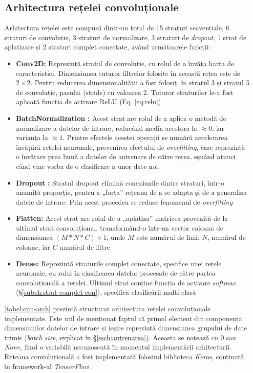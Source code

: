 \subsection{Arhitectura rețelei convoluționale}
Arhitectura rețelei este compusă dintr-un total de 15 straturi secvențiale, 6 straturi de convoluție, 3 straturi de normalizare, 3 straturi de \textit{dropout}, 1 strat de aplatizare și 2 straturi complet conectate, având următoarele funcții:
\begin{itemize}
\item \textbf{Conv2D:} Reprezintă stratul de convoluție, cu rolul de a învăța harta de caracteristici. Dimensiunea tuturor filtrelor folosite în această rețea este de $2\times2$. Pentru reducerea dimensionalității a fost folosit, în stratul 3 și stratul 5 de convoluție, pasului (stride) cu valoarea 2. Tuturor straturilor le-a fost aplicată funcția de activare ReLU (Eq. \ref{eq:relu})
\item \textbf{BatchNormalization \textnormal{\cite{ioffe2015batch}}:} Acest strat are rolul de a aplica o metodă de normalizare a datelor de intrare, reducând media acestora la $\approx0$, iar varianța la $\approx1$. Printre efectele acestei operații se numără accelerarea învățării rețelei neuronale, prevenirea efectului de \textit{overfitting}, care reprezintă o învățare prea bună a datelor de antrenare de către rețea, eșuând atunci când vine vorba de o clasificare a unor date noi.
\item \textbf{Dropout \textnormal{\cite{hinton2012improving-dropout}}:} Stratul dropout elimină conexiunile dintre straturi, într-o anumită proporție, pentru a „forța” rețeaua de a se adapta și de a generaliza datele de intrare. Prin acest procedeu se reduce fenomenul de \textit{overfitting}
\item \textbf{Flatten:} Acest strat are rolul de a „aplatiza” matricea provenită de la ultimul strat convoluțional, transformând-o într-un vector coloană de dimensiunea $(M*N*C)\times1$, unde $M$ este numărul de linii, $N$, numărul de coloane, iar $C$ numărul de filtre
\item \textbf{Dense:} Reprezintă straturile complet conectate, specifice unei rețele neuronale, cu rolul în clasificarea datelor procesate de către partea convoluțională a rețelei. Ultimul strat conține funcția de activare \textit{softmax} (\S\ref{subch:strat-complet-con}), specifică clasificării multi-clasă
\end{itemize}

\autoref{tabel:cnn-arch} prezintă structurat arhitectura rețelei convoluționale implementate. Este util de menționat faptul că primul element din componența dimensiunilor datelor de intrare și ieșire reprezintă dimensiunea grupului de date trimis (\textit{batch size}, explicat în \S\ref{ssch:antrenarea}). Aceasta se notează cu 0 sau \textit{None}, fiind o variabilă necunoscută în momentul implementării arhitecturii. Rețeaua convoluțională a fost implementată folosind biblioteca \textit{Keras}, conținută în framework-ul \textit{TensorFlow} \cite{online:tf-keras}.

